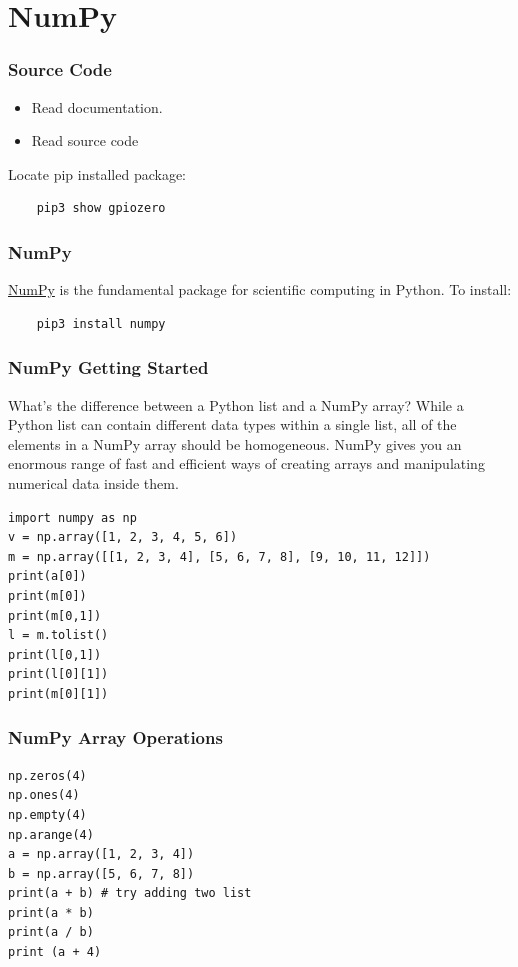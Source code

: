 \documentclass[12pt,letterpaper]{beamer}
\begin{document}
\section{NumPy}
\begin{frame}[fragile]
    \frametitle{Source Code}

    \begin{itemize}
        \item Read documentation.
        \item Read source code
    \end{itemize}
    Locate pip installed package: 
    \begin{verbatim}
    pip3 show gpiozero
    \end{verbatim}
\end{frame}

\begin{frame}[fragile]
    \frametitle{NumPy}

    \href{https://numpy.org/doc/stable/index.html}{NumPy} is the fundamental package for scientific computing in Python. To install:
    \begin{verbatim}
    pip3 install numpy
    \end{verbatim}
\end{frame}

\begin{frame}[fragile]
    \frametitle{NumPy Getting Started}
    {\footnotesize
        \begin{block}{What's the difference between a Python list and a NumPy array? }
            While a Python list can contain different data types within a single list, all of the elements in a NumPy array should be homogeneous. 
            NumPy gives you an enormous range of fast and efficient ways of creating arrays and manipulating numerical data inside them.
        \end{block}
    }
    {\scriptsize
    \begin{verbatim}
import numpy as np
v = np.array([1, 2, 3, 4, 5, 6])
m = np.array([[1, 2, 3, 4], [5, 6, 7, 8], [9, 10, 11, 12]])
print(a[0])
print(m[0])
print(m[0,1])
l = m.tolist()
print(l[0,1])
print(l[0][1])
print(m[0][1])

    \end{verbatim}
    }
\end{frame}

\begin{frame}[fragile]
    \frametitle{NumPy Array Operations}
    {\scriptsize
    \begin{verbatim}
np.zeros(4)
np.ones(4)
np.empty(4)
np.arange(4)
a = np.array([1, 2, 3, 4])
b = np.array([5, 6, 7, 8])
print(a + b) # try adding two list
print(a * b)
print(a / b)
print (a + 4)
    \end{verbatim}
    }
\end{frame}
\end{document}
